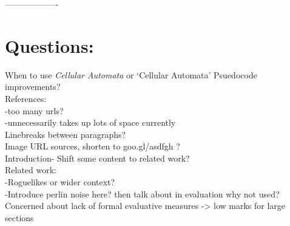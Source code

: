 \documentclass[12pt,a4paper]{article}
\begin{document}
-------------------

\section{Questions: } 

When to use \emph{Cellular Automata} or `Cellular Automata'
Psuedocode improvements? \\
References:\\
-too many urls?\\
-unnecessarily takes up lots of space currently \\
Linebreaks between paragraphs? \\
Image URL sources, shorten to goo.gl/asdfgh ?\\
Introduction- Shift some content to related work? \\
Related work:\\
-Roguelikes or wider context? \\
-Introduce perlin noise here? then talk about in evaluation why not used?\\

Concerned about lack of formal evaluative measures -> low marks for large sections





{} %

\end{document}
